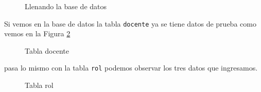  \begin{figure}[H]
\caption{Llenando la base de datos}\label{fig:populating}
\centering
{}
\end{figure}
Si vemos en la base de datos la tabla \texttt{docente} ya se tiene datos de prueba como vemos en la Figura \ref{fig:tableDocente}
\begin{figure}[H]
\caption{Tabla docente}\label{fig:tableDocente}
\centering
{}
\end{figure}
pasa lo mismo con la tabla \texttt{rol} podemos observar los tres datos que ingresamos.
\begin{figure}[H]
\caption{Tabla rol}\label{fig:tableRol}
\centering
{}
\end{figure}
